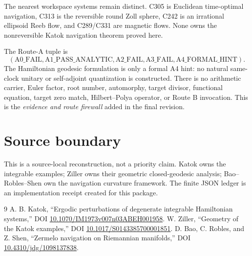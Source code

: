 \documentclass[10pt]{article}
\begin{document}
The nearest workspace systems remain distinct.  C305 is Euclidean
time-optimal navigation, C313 is the reversible round Zoll sphere, C242 is
an irrational ellipsoid Reeb flow, and C289/C331 are magnetic flows.  None
owns the nonreversible Katok navigation theorem proved here.

The Route-A tuple is
\[
 (\mathrm{A0\_FAIL},\mathrm{A1\_PASS\_ANALYTIC},
  \mathrm{A2\_FAIL},\mathrm{A3\_FAIL},
  \mathrm{A4\_FORMAL\_HINT}).
\]
The Hamiltonian geodesic formulation is only a formal A4 hint: no natural
same-clock unitary or self-adjoint quantization is constructed.  There is no
arithmetic carrier, Euler factor, root number, automorphy, target divisor,
functional equation, target zero match, Hilbert--Polya operator, or Route B
invocation.  This is the \emph{evidence and route firewall} added in the
final revision.
\fi

\section*{Source boundary}
This is a source-local reconstruction, not a priority claim.  Katok owns the
integrable examples; Ziller owns their geometric closed-geodesic analysis;
Bao--Robles--Shen own the navigation curvature framework.  The finite JSON
ledger is an implementation receipt created for this package.

\begin{thebibliography}{9}
A. B. Katok, ``Ergodic perturbations of degenerate integrable Hamiltonian
systems,'' DOI \url{10.1070/IM1973v007n03ABEH001958}.
W. Ziller, ``Geometry of the Katok examples,'' DOI
\url{10.1017/S0143385700001851}.
D. Bao, C. Robles, and Z. Shen, ``Zermelo navigation on Riemannian
manifolds,'' DOI \url{10.4310/jdg/1098137838}.
\end{thebibliography}
\end{document}
